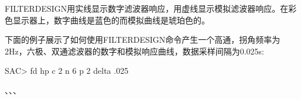 FILTERDESIGN用实线显示数字滤波器响应，用虚线显示模拟滤波器响应。在彩色显示器上，数字曲线是蓝色的而模拟曲线是琥珀色的。

下面的例子展示了如何使用FILTERDESIGN命令产生一个高通，拐角频率为2Hz，六极、双通滤波器的数字和模拟响应曲线，数据采样间隔为0.025s:
\begin{SACCode}
SAC> fd hp c 2 n 6 p 2 delta .025
\end{SACCode}

、、、
